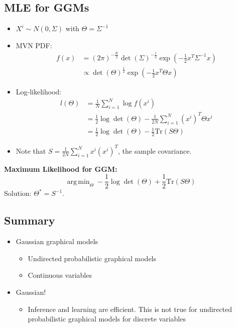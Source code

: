 \documentclass[10pt]{article}
\DeclareMathOperator*{\argmin}{arg\,min}
\begin{document}
\subsection*{MLE for GGMs}
\begin{itemize}
	\item $X^i \sim N(0, \Sigma)$ with $\Theta = \Sigma^{-1}$
	\item MVN PDF: 
    \begin{align*}
        f(x) &= (2\pi)^{-\frac{K}{2}} \det(\Sigma)^{-\frac{1}{2}} \exp \left(-\frac{1}{2} x^T \Sigma^{-1}x\right) \\
        &\propto \det(\Theta)^{\frac{1}{2}} \exp \left(-\frac{1}{2} x^T \Theta x\right)
    \end{align*}
	\item Log-likelihood:
	\begin{align*}
        l(\Theta) &= \frac{1}{N} \sum_{i = 1}^N \log f(x^i) \\
        &= \frac{1}{2} \log \det(\Theta) - \frac{1}{2N} \sum_{i = 1}^N (x^i)^T \Theta x^i \\
        &= \frac{1}{2} \log \det(\Theta) - \frac{1}{2} \text{Tr}(S\Theta)
    \end{align*}
    \item Note that $S = \frac{1}{2N} \sum_{i = 1}^N x^i(x^i)^T$, the sample covariance.
\end{itemize}

\textbf{Maximum Likelihood for GGM:}
\[\argmin_\Theta - \frac{1}{2} \log \det(\Theta) + \frac{1}{2} \text{Tr}(S\Theta)\]
Solution: $\Theta^* = S^{-1}$.

\subsection*{Summary}
\begin{itemize}
	\item Gaussian graphical models
	\begin{itemize}
	    \item Undirected probabilistic graphical models
	    \item Continuous variables
    \end{itemize}
	\item Gaussian!
	\begin{itemize}
	    \item Inference and learning are efficient.  This is not true for undirected probabilistic graphical models for discrete variables
    \end{itemize}
\end{itemize}
\end{document}

